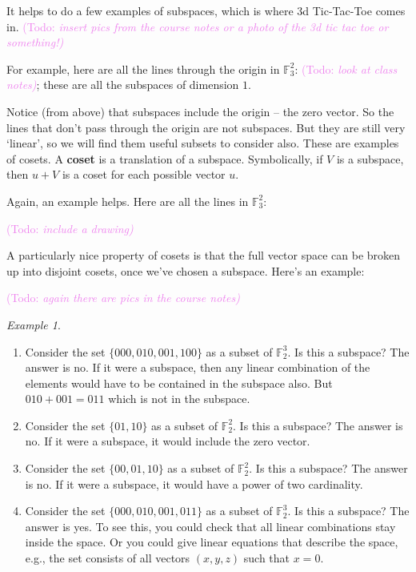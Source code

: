 \documentclass{article}
\theoremstyle{plain}
\theoremstyle{definition}
\theoremstyle{remark}
\newtheorem{example}[theorem]{Example}
\numberwithin{theorem}{section}
\newcommand{\KS}[1]{\textcolor{violet}{{\sf (Todo:} {\sl{#1})}}}
\newcommand{\KS}[1]{}
\newcommand{\FF}{\mathbb{F}}
\begin{document}
It helps to do a few examples of subspaces, which is where 3d Tic-Tac-Toe comes in.  \KS{insert pics from the course notes or a photo of the 3d tic tac toe or something!}

For example, here are all the lines through the origin in $\FF_3^2$: \KS{look at class notes}; these are all the subspaces of dimension $1$.

Notice (from above) that subspaces include the origin -- the zero vector.  So the lines that don't pass through the origin are not subspaces.  But they are still very `linear', so we will find them useful subsets to consider also.  These are examples of cosets.  A \textbf{coset} is a translation of a subspace.  Symbolically, if $V$ is a subspace, then $u + V$ is a coset for each possible vector $u$.

Again, an example helps.  Here are all the lines in $\FF_3^2$:

\KS{include a drawing}

A particularly nice property of cosets is that the full vector space can be broken up into disjoint cosets, once we've chosen a subspace.  Here's an example:

\KS{again there are pics in the course notes}

\begin{example}
\begin{enumerate}
    \item Consider the set $\{ 000, 010, 001, 100 \}$ as a subset of $\FF_2^3$.  Is this a subspace?  The answer is no.
        If it were a subspace, then any linear combination of the elements would have to be contained in the subspace also.  But $010 + 001 = 011$ which is not in the subspace.
        \item Consider the set $\{ 01, 10 \}$ as a subset of $\FF_2^2$.  Is this a subspace?  The answer is no.  If it were a subspace, it would include the zero vector.  \item Consider the set $\{ 00, 01, 10 \}$ as a subset of $\FF_2^2$.  Is this a subspace?  The answer is no.  If it were a subspace, it would have a power of two cardinality.
        \item Consider the set $\{ 000, 010, 001, 011 \}$ as a subset of $\FF_2^3$.  Is this a subspace?  The answer is yes.  To see this, you could check that all linear combinations stay inside the space.  Or you could give linear equations that describe the space, e.g., the set consists of all vectors $(x,y,z)$ such that $x=0$.
\end{enumerate}
\end{example}
\end{document}
